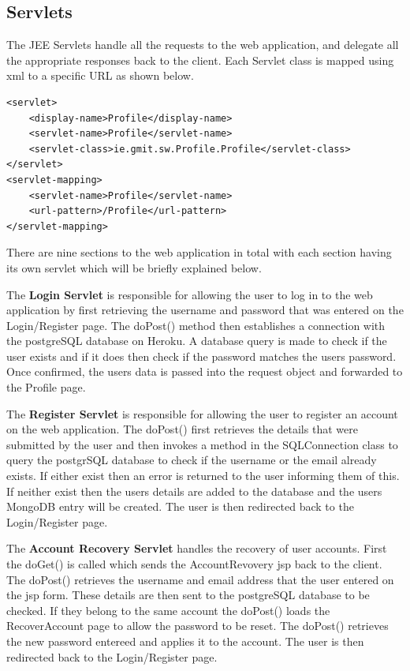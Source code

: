 \subsection{Servlets}
The JEE Servlets handle all the requests to the web application, and delegate all the appropriate responses back to the client. Each Servlet class is mapped using xml to a specific URL as shown below.

\begin{verbatim}
<servlet>
    <display-name>Profile</display-name>
    <servlet-name>Profile</servlet-name>
    <servlet-class>ie.gmit.sw.Profile.Profile</servlet-class>
</servlet>
<servlet-mapping>
    <servlet-name>Profile</servlet-name>
    <url-pattern>/Profile</url-pattern>
</servlet-mapping>	
\end{verbatim}

There are nine sections to the web application in total with each section having its own servlet which will be briefly explained below.\\

\par The \textbf{Login Servlet} is responsible for allowing the user to log in to the web application by first retrieving the username and password that was entered on the Login/Register page. The doPost() method then establishes a connection with the postgreSQL database on Heroku. A database query is made to check if the user exists and if it does then check if the password matches the users password. Once confirmed, the users data is passed into the request object and forwarded to the Profile page.\\

\par The \textbf{Register Servlet} is responsible for allowing the user to register an account on the web application. The doPost() first retrieves the details that were submitted by the user and then invokes a method in the SQLConnection class to query the postgrSQL database to check if the username or the email already exists. If either exist then an error is returned to the user informing them of this. If neither exist then the users details are added to the database and the users MongoDB entry will be created. The user is then redirected back to the Login/Register page.\\

\par The \textbf{Account Recovery Servlet} handles the recovery of user accounts. First the doGet() is called which sends the AccountRevovery jsp back to the client. The doPost() retrieves the username and email address that the user entered on the jsp form. These details are then sent to the postgreSQL database to be checked. If they belong to the same account the doPost() loads the RecoverAccount page to allow the password to be reset. The doPost() retrieves the new password entereed and applies it to the account. The user is then redirected back to the Login/Register page.\\

